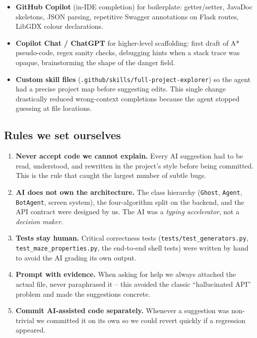 \documentclass[11pt,a4paper]{article}
\begin{document}
\begin{itemize}[leftmargin=1.3em,itemsep=1pt]
  \item \textbf{GitHub Copilot} (in-IDE completion) for boilerplate:
        getter/setter, JavaDoc skeletons, JSON parsing, repetitive
        Swagger annotations on Flask routes, LibGDX colour declarations.
  \item \textbf{Copilot Chat / ChatGPT} for higher-level scaffolding:
        first draft of A* pseudo-code, regex sanity checks, debugging
        hints when a stack trace was opaque, brainstorming the shape of
        the danger field.
  \item \textbf{Custom skill files} (\texttt{.github/skills/full-project-explorer})
        so the agent had a precise project map before suggesting edits.
        This single change drastically reduced wrong-context completions
        because the agent stopped guessing at file locations.
\end{itemize}

\subsection{Rules we set ourselves}

\begin{enumerate}[leftmargin=1.3em,itemsep=1pt]
  \item \textbf{Never accept code we cannot explain.} Every AI
        suggestion had to be read, understood, and rewritten in the
        project's style before being committed. This is the rule that
        caught the largest number of subtle bugs.
  \item \textbf{AI does not own the architecture.} The class hierarchy
        (\texttt{Ghost}, \texttt{Agent}, \texttt{BotAgent}, screen
        system), the four-algorithm split on the backend, and the API
        contract were designed by us. The AI was a \emph{typing
        accelerator}, not a \emph{decision maker}.
  \item \textbf{Tests stay human.} Critical correctness tests
        (\texttt{tests/test\_generators.py},
        \texttt{test\_maze\_properties.py}, the end-to-end shell tests)
        were written by hand to avoid the AI grading its own output.
  \item \textbf{Prompt with evidence.} When asking for help we always
        attached the actual file, never paraphrased it -- this avoided
        the classic ``hallucinated API'' problem and made the
        suggestions concrete.
  \item \textbf{Commit AI-assisted code separately.} Whenever a
        suggestion was non-trivial we committed it on its own so we
        could revert quickly if a regression appeared.
\end{enumerate}
\end{document}
